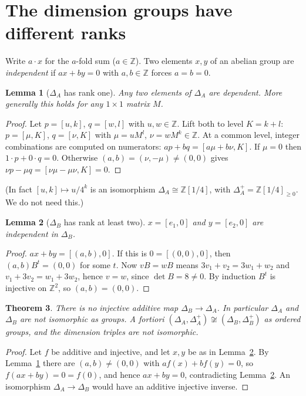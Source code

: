 \documentclass[11pt]{article}
\newtheorem{theorem}{Theorem}
\newtheorem{lemma}[theorem]{Lemma}
\theoremstyle{definition}
\theoremstyle{remark}
\newcommand{\Z}{\mathbb{Z}}
\begin{document}
\section{The dimension groups have different ranks}
Write $a\cdot x$ for the $a$-fold sum ($a\in\Z$). Two elements $x,y$ of an abelian
group are \emph{independent} if $ax+by=0$ with $a,b\in\Z$ forces $a=b=0$.

\begin{lemma}[$\Delta_A$ has rank one]\label{lem:rank1}
Any two elements of $\Delta_A$ are dependent. More generally this holds for any
$1\times1$ matrix $M$.
\end{lemma}
\begin{proof}
Let $p=[u,k]$, $q=[w,l]$ with $u,w\in\Z$. Lift both to level $K=k+l$:
$p=[\mu,K]$, $q=[\nu,K]$ with $\mu=uM^l$, $\nu=wM^k\in\Z$. At a common level,
integer combinations are computed on numerators:
$a p+bq=[a\mu+b\nu,K]$. If $\mu=0$ then $1\cdot p+0\cdot q=0$. Otherwise
$(a,b)=(\nu,-\mu)\ne(0,0)$ gives $\nu p-\mu q=[\nu\mu-\mu\nu,K]=0$.
\end{proof}
(In fact $[u,k]\mapsto u/4^k$ is an isomorphism $\Delta_A\cong\Z[1/4]$, with
$\Delta_A^+=\Z[1/4]_{\ge0}$. We do not need this.)

\begin{lemma}[$\Delta_B$ has rank at least two]\label{lem:rank2}
$x=[e_1,0]$ and $y=[e_2,0]$ are independent in $\Delta_B$.
\end{lemma}
\begin{proof}
$ax+by=[(a,b),0]$. If this is $0=[(0,0),0]$, then $(a,b)B^t=(0,0)$ for some $t$. Now
$vB=wB$ means $3v_1+v_2=3w_1+w_2$ and $v_1+3v_2=w_1+3w_2$, hence $v=w$, since
$\det B=8\ne0$. By induction $B^t$ is injective on $\Z^2$, so $(a,b)=(0,0)$.
\end{proof}

\begin{theorem}\label{thm:main}
There is no injective additive map $\Delta_B\to\Delta_A$. In particular $\Delta_A$
and $\Delta_B$ are not isomorphic as groups. A fortiori
$(\Delta_A,\Delta_A^+)\not\cong(\Delta_B,\Delta_B^+)$ as ordered groups, and the
dimension triples are not isomorphic.
\end{theorem}
\begin{proof}
Let $f$ be additive and injective, and let $x,y$ be as in Lemma~\ref{lem:rank2}. By
Lemma~\ref{lem:rank1} there are $(a,b)\neq(0,0)$ with $af(x)+bf(y)=0$, so
$f(ax+by)=0=f(0)$, and hence $ax+by=0$, contradicting Lemma~\ref{lem:rank2}. An
isomorphism $\Delta_A\to\Delta_B$ would have an additive injective inverse.
\end{proof}
\end{document}
